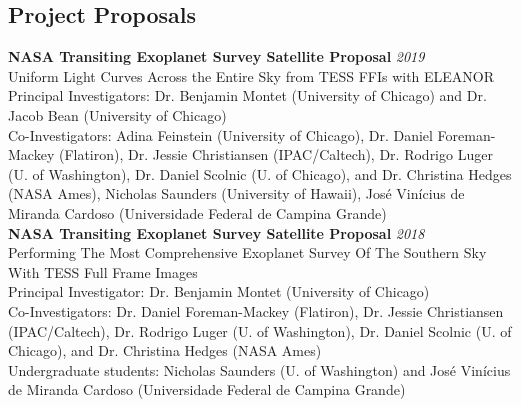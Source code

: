\documentclass[10pt]{article}
\begin{document}
\begin{titlepage}
\section*{Project Proposals}
    \textbf{NASA Transiting Exoplanet Survey Satellite Proposal}
    \hfill \textit{2019}\\
    Uniform Light Curves Across the Entire Sky from TESS FFIs with ELEANOR\\
    {\small Principal Investigators: Dr. Benjamin Montet (University of Chicago) and Dr. Jacob Bean (University of Chicago)}\\
    {\small Co-Investigators: Adina Feinstein (University of Chicago), Dr. Daniel Foreman-Mackey (Flatiron),
    Dr. Jessie Christiansen (IPAC/Caltech), Dr. Rodrigo Luger (U. of Washington),
    Dr. Daniel Scolnic (U. of Chicago), and Dr. Christina Hedges (NASA Ames),
  Nicholas Saunders (University of Hawaii), Jos\'e Vin\'icius de Miranda Cardoso (Universidade Federal de Campina Grande)}\\

    \textbf{NASA Transiting Exoplanet Survey Satellite Proposal}
    \hfill \textit{2018}\\
    Performing The Most Comprehensive Exoplanet Survey Of The Southern Sky With TESS Full Frame Images\\
    {\small Principal Investigator: Dr. Benjamin Montet (University of Chicago)}\\
    {\small Co-Investigators: Dr. Daniel Foreman-Mackey (Flatiron), Dr. Jessie Christiansen (IPAC/Caltech),
    Dr. Rodrigo Luger (U. of Washington), Dr. Daniel Scolnic (U. of Chicago), and Dr. Christina Hedges (NASA Ames)}\\
    {\small Undergraduate students: Nicholas Saunders (U. of Washington) and
      Jos\'e Vin\'icius de Miranda Cardoso (Universidade Federal de Campina Grande)}


\end{titlepage}
\end{document}
